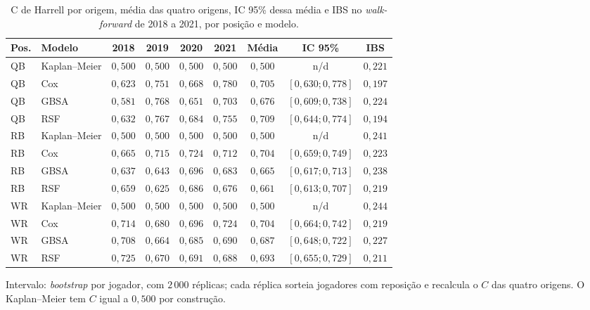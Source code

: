 \begin{table}[H]
\centering
\caption{C de Harrell por origem, média das quatro origens, IC 95\% dessa média e IBS no \textit{walk-forward} de 2018 a 2021, por posição e modelo.}
\label{tab:tgb_wf}
\thesistablesetup\footnotesize
\footnotesize\setlength{\tabcolsep}{3pt}
\begin{tabular*}{\textwidth}{@{\extracolsep{\fill}}llccccccc@{}}
\toprule
\textbf{Pos.} & \textbf{Modelo} & \textbf{2018} & \textbf{2019} & \textbf{2020} & \textbf{2021} & \textbf{Média} & \textbf{IC 95\%} & \textbf{IBS} \\
\midrule
QB & Kaplan--Meier & $0{,}500$ & $0{,}500$ & $0{,}500$ & $0{,}500$ & $0{,}500$ & n/d & $0{,}221$ \\
QB & Cox           & $0{,}623$ & $0{,}751$ & $0{,}668$ & $0{,}780$ & $0{,}705$ & $[0{,}630; 0{,}778]$ & $0{,}197$ \\
QB & GBSA          & $0{,}581$ & $0{,}768$ & $0{,}651$ & $0{,}703$ & $0{,}676$ & $[0{,}609; 0{,}738]$ & $0{,}224$ \\
QB & RSF           & $0{,}632$ & $0{,}767$ & $0{,}684$ & $0{,}755$ & $0{,}709$ & $[0{,}644; 0{,}774]$ & $0{,}194$ \\
\midrule
RB & Kaplan--Meier & $0{,}500$ & $0{,}500$ & $0{,}500$ & $0{,}500$ & $0{,}500$ & n/d & $0{,}241$ \\
RB & Cox           & $0{,}665$ & $0{,}715$ & $0{,}724$ & $0{,}712$ & $0{,}704$ & $[0{,}659; 0{,}749]$ & $0{,}223$ \\
RB & GBSA          & $0{,}637$ & $0{,}643$ & $0{,}696$ & $0{,}683$ & $0{,}665$ & $[0{,}617; 0{,}713]$ & $0{,}238$ \\
RB & RSF           & $0{,}659$ & $0{,}625$ & $0{,}686$ & $0{,}676$ & $0{,}661$ & $[0{,}613; 0{,}707]$ & $0{,}219$ \\
\midrule
WR & Kaplan--Meier & $0{,}500$ & $0{,}500$ & $0{,}500$ & $0{,}500$ & $0{,}500$ & n/d & $0{,}244$ \\
WR & Cox           & $0{,}714$ & $0{,}680$ & $0{,}696$ & $0{,}724$ & $0{,}704$ & $[0{,}664; 0{,}742]$ & $0{,}219$ \\
WR & GBSA          & $0{,}708$ & $0{,}664$ & $0{,}685$ & $0{,}690$ & $0{,}687$ & $[0{,}648; 0{,}722]$ & $0{,}227$ \\
WR & RSF           & $0{,}725$ & $0{,}670$ & $0{,}691$ & $0{,}688$ & $0{,}693$ & $[0{,}655; 0{,}729]$ & $0{,}211$ \\
\bottomrule
\end{tabular*}
\par\smallskip
\begin{minipage}{\textwidth}
{\small Intervalo: \textit{bootstrap} por jogador, com $2\,000$ réplicas; cada réplica sorteia jogadores com reposição e recalcula o $C$ das quatro origens. O Kaplan--Meier tem $C$ igual a $0{,}500$ por construção.}
\end{minipage}
\end{table}

